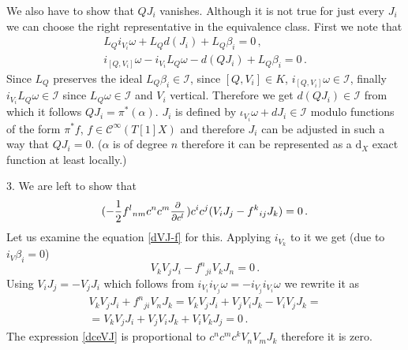 \documentclass[a4paper,12pt]{article}
\numberwithin{equation}{section} %
\newcommand{\dx}{\mathrm{d}_X}
\renewcommand{\d}{\partial}
\newcommand{\ffrac}[2]{\raisebox{.5pt}%
  {\footnotesize$\displaystyle\frac{#1}{#2}$}\kern1pt}
\newcommand{\ddl}[2]{\ffrac{\d #1}{\d #2}}
\newcommand{\cC}{\mathcal{C}}
\def\cI{\mathcal{I}}
\begin{document}
We also have to show that $QJ_i$ vanishes. Although it is not true for just every $J_i$ we can choose the right representative in the equivalence class. First we note that
\begin{equation}
\begin{gathered}
    L_Qi_{V_i}\omega + L_Q d(J_i) + L_Q\beta_i  = 0\,, \\
    i_{[Q,V_i]} \omega - i_{V_i} L_Q \omega - d(QJ_i) + L_Q \beta_i = 0\,.
\end{gathered}
\end{equation}
Since $L_Q$ preserves the ideal $L_Q \beta_i \in \cI$, since $[Q,V_i] \in K$, $i_{[Q,V_i]}\omega \in \cI$, finally $i_{V_i}L_Q\omega \in \cI$ since $L_Q \omega \in \cI$ and $V_i$ vertical. Therefore we get $d(QJ_i) \in \cI$ from which it follows $QJ_i = \pi^*(\alpha)$. $J_i$ is defined by $\iota_{V_i}\omega+d J_i\in\cI$  modulo functions of the form $\pi^*f$, $f\in \cC^\infty(T[1]X)$ and therefore $J_i$ can be adjusted in such a way that $QJ_i = 0$. ($\alpha$ is of degree $n$ therefore it can be represented as a $\dx$ exact function at least locally.)

3. We are left to show that
\begin{equation} \label{dceVJ}
    ( - \frac{1}{2}f^l{ }_{nm} c^n c^m \ddl{}{c^l})c^ic^j(V_iJ_j - f^k{ }_{ij}J_k) = 0\,.
\end{equation}
Let us examine the equation \eqref{dVJ-f} for this. Applying $i_{V_k}$ to it we get (due to $i_V \beta_i= 0$)
\begin{equation}
    V_k V_j J_i - f^n{ }_{ji}V_kJ_n = 0\,.
\end{equation}
Using $V_iJ_j = -V_jJ_i$ which follows from $i_{V_i}i_{V_j}\omega = - i_{V_j}i_{V_i}\omega$ we rewrite it as 
\begin{equation}
\begin{gathered}
    V_k V_j J_i + f^n{ }_{ji}V_n J_k =  V_k V_j J_i + V_j V_i J_k - V_i V_j J_k = \\ = V_k V_j J_i + V_j V_i J_k + V_i V_k J_j = 0\,.
\end{gathered}
\end{equation}
The expression \eqref{dceVJ} is proportional to $c^n c^m c^k V_n V_m J_k $ therefore it is zero.
\end{document}
